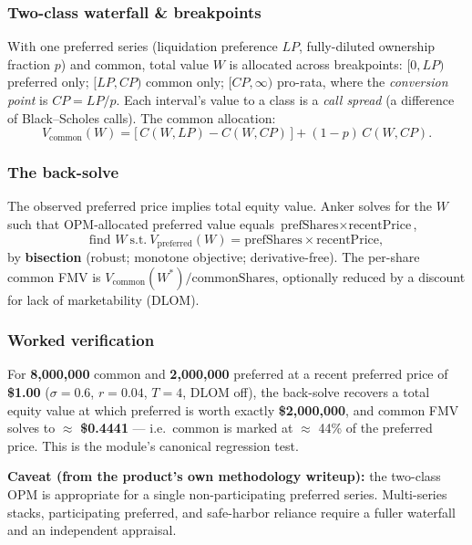 \documentclass[11pt]{article}
\newcommand{\note}[1]{\par\noindent\colorbox{gray!8}{\parbox{0.97\linewidth}{\small #1}}\par\medskip}
\begin{document}
\subsubsection{Two-class waterfall \& breakpoints}
With one preferred series (liquidation preference $LP$, fully-diluted ownership
fraction $p$) and common, total value $W$ is allocated across breakpoints:
$[0,LP)$ preferred only; $[LP,CP)$ common only; $[CP,\infty)$ pro-rata, where the
\emph{conversion point} is $CP = LP/p$. Each interval's value to a class is a
\emph{call spread} (a difference of Black--Scholes calls). The common allocation:
\begin{equation}
V_{\text{common}}(W) = \big[\,C(W,LP) - C(W,CP)\,\big] + (1-p)\,C(W,CP).
\end{equation}

\subsubsection{The back-solve}
The observed preferred price implies total equity value. Anker solves for the $W$
such that OPM-allocated preferred value equals $\text{prefShares}\times
\text{recentPrice}$,
\begin{equation}
\text{find } W \ \text{s.t.}\ V_{\text{preferred}}(W) = \text{prefShares}\times
\text{recentPrice},
\end{equation}
by \textbf{bisection} (robust; monotone objective; derivative-free). The per-share
common FMV is $V_{\text{common}}(W^\ast)/\text{commonShares}$, optionally reduced
by a discount for lack of marketability (DLOM).

\subsubsection{Worked verification}
For \textbf{8{,}000{,}000} common and \textbf{2{,}000{,}000} preferred at a recent
preferred price of \textbf{\$1.00} ($\sigma=0.6$, $r=0.04$, $T=4$, DLOM off), the
back-solve recovers a total equity value at which preferred is worth exactly
\textbf{\$2{,}000{,}000}, and common FMV solves to $\approx$ \textbf{\$0.4441} ---
i.e.\ common is marked at $\approx$ 44\% of the preferred price. This is the
module's canonical regression test.

\note{\textbf{Caveat (from the product's own methodology writeup):} the two-class
OPM is appropriate for a single non-participating preferred series. Multi-series
stacks, participating preferred, and safe-harbor reliance require a fuller
waterfall and an independent appraisal.}
\end{document}
